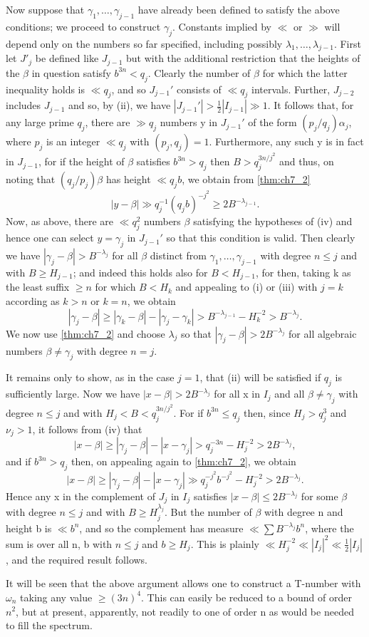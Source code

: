 Now suppose that $\gamma_1, \dots, \gamma_{j-1}$ have already been defined to satisfy the above conditions; we proceed to construct $\gamma_j$. Constants implied by $\ll$ or $\gg$ will depend only on the numbers so far specified, including possibly $\lambda_1, \dots, \lambda_{j-1}$. First let $J'_j$ be defined like $J_{j-1}$ but with the additional restriction that the heights of the $\beta$ in question satisfy $b^{3n} < q_j$. Clearly the number of $\beta$ for which the latter inequality holds is $\ll q_j$, and so $J_{j-1}'$ consists of $\ll q_j$ intervals. Further, $J_{j-2}$ includes $J_{j-1}$ and so, by (ii), we have $|J_{j-1}'| > \frac{1}{2}|I_{j-1}| \gg 1$. It follows that, for any large prime $q_j$, there are $\gg q_j$ numbers y in $J_{j-1}'$ of the form $(p_j/q_j)\alpha_j$, where $p_j$ is an integer $\ll q_j$ with $(p_j, q_j) = 1$. Furthermore, any such y is in fact in $J_{j-1}$, for if the height of $\beta$ satisfies $b^{3n} > q_j$ then $B > q_j^{3n/j^2}$ and thus, on noting that $(q_j/p_j)\beta$ has height $\ll q_j b$, we obtain from \autoref{thm:ch7_2}
\[|y-\beta| \gg q_j^{-1}(q_j b)^{-j^2} \ge 2B^{-\lambda_{j-1}}.\]
Now, as above, there are $\ll q_j^2$ numbers $\beta$ satisfying the hypotheses of (iv) and hence one can select $y = \gamma_j$ in $J_{j-1}'$ so that this condition is valid. Then clearly we have $|\gamma_j-\beta| > B^{-\lambda_j}$ for all $\beta$ distinct from $\gamma_1, \dots, \gamma_{j-1}$ with degree $n \le j$ and with $B \ge H_{j-1}$; and indeed this holds also for $B < H_{j-1}$, for then, taking k as the least suffix $\ge n$ for which $B < H_k$ and appealing to (i) or (iii) with $j=k$ according as $k > n$ or $k = n$, we obtain
\[|\gamma_j-\beta| \ge |\gamma_k-\beta| - |\gamma_j-\gamma_k| > B^{-\lambda_{j-1}} - H_k^{-2} > B^{-\lambda_j}.\]
We now use \autoref{thm:ch7_2} and choose $\lambda_j$ so that $|\gamma_j-\beta| > 2B^{-\lambda_j}$ for all algebraic numbers $\beta \neq \gamma_j$ with degree $n = j$.

It remains only to show, as in the case $j=1$, that (ii) will be satisfied if $q_j$ is sufficiently large. Now we have $|x-\beta| > 2B^{-\lambda_j}$ for all x in $I_j$ and all $\beta \neq \gamma_j$ with degree $n \le j$ and with $H_j < B < q_j^{3n/j^2}$. For if $b^{3n} \le q_j$ then, since $H_j > q_j^3$ and $\nu_j > 1$, it follows from (iv) that
\[|x-\beta| \ge |\gamma_j-\beta| - |x-\gamma_j| > q_j^{-3n} - H_j^{-2} > 2B^{-\lambda_j},\]
and if $b^{3n} > q_j$ then, on appealing again to \autoref{thm:ch7_2}, we obtain
\[|x-\beta| \ge |\gamma_j-\beta| - |x-\gamma_j| \gg q_j^{-j^2}b^{-j^2} - H_j^{-2} > 2B^{-\lambda_j}.\]
Hence any x in the complement of $J_j$ in $I_j$ satisfies $|x-\beta| \le 2B^{-\lambda_j}$ for some $\beta$ with degree $n \le j$ and with $B \ge H_j^{\lambda_j}$. But the number of $\beta$ with degree n and height b is $\ll b^n$, and so the complement has measure $\ll \sum B^{-\lambda_j}b^n$, where the sum is over all n, b with $n \le j$ and $b \ge H_j$. This is plainly $\ll H_j^{-2} \ll |I_j|^2 \ll \frac{1}{2}|I_j|$, and the required result follows.

It will be seen that the above argument allows one to construct a T-number with $\omega_n$ taking any value $\ge (3n)^4$. This can easily be reduced to a bound of order $n^2$, but at present, apparently, not readily to one of order n as would be needed to fill the spectrum.
